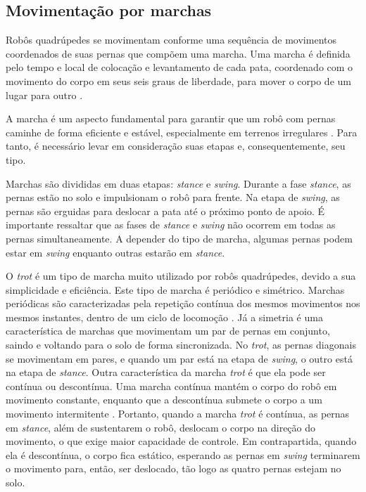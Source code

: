 \documentclass[conference]{IEEEtran}
\begin{document}
\subsection{Movimentação por marchas}
Robôs quadrúpedes se movimentam conforme uma sequência de movimentos coordenados de suas pernas que compõem uma marcha. Uma marcha é definida pelo tempo e local de colocação e levantamento de cada pata, coordenado com o movimento do corpo em seus seis graus de liberdade, para mover o corpo de um lugar para outro  \cite{Song1989}.

A marcha é um aspecto fundamental para garantir que um robô com pernas caminhe de forma eficiente e estável, especialmente em terrenos irregulares \cite{X.129}. Para tanto, é necessário levar em consideração suas etapas e, consequentemente, seu tipo.

Marchas são divididas em duas etapas: \textit{stance} e \textit{swing}. Durante a fase \textit{stance}, as pernas estão no solo e impulsionam o robô para frente. Na etapa de \textit{swing}, as pernas são erguidas para deslocar a pata até o próximo ponto de apoio. É importante ressaltar que as fases de \textit{stance} e \textit{swing} não ocorrem em todas as pernas simultaneamente. A depender do tipo de marcha, algumas pernas podem estar em \textit{swing} enquanto outras estarão em \textit{stance}.

O \textit{trot} é um tipo de marcha muito utilizado por robôs quadrúpedes, devido a sua simplicidade e eficiência. Este tipo de marcha é periódico e simétrico. Marchas periódicas são caracterizadas pela repetição contínua dos mesmos movimentos nos mesmos instantes, dentro de um ciclo de locomoção \cite{de2006quadrupedal}. Já a simetria é uma característica de marchas que movimentam um par de pernas em conjunto, saindo e voltando para o solo de forma sincronizada. No \textit{trot}, as pernas diagonais se movimentam em pares, e quando um par está na etapa de \textit{swing}, o outro está na etapa de \textit{stance}. Outra característica da marcha \textit{trot} é que ela pode ser contínua ou descontínua. Uma marcha contínua mantém o corpo do robô em movimento constante, enquanto que a descontínua submete o corpo a um movimento intermitente \cite{de2006quadrupedal}. Portanto, quando a marcha \textit{trot} é contínua, as pernas em \textit{stance}, além de sustentarem o robô, deslocam o corpo na direção do movimento, o que exige maior capacidade de controle. Em contrapartida, quando ela é descontínua, o corpo fica estático, esperando as pernas em \textit{swing} terminarem o movimento para, então, ser deslocado, tão logo as quatro pernas estejam no solo.
\end{document}
